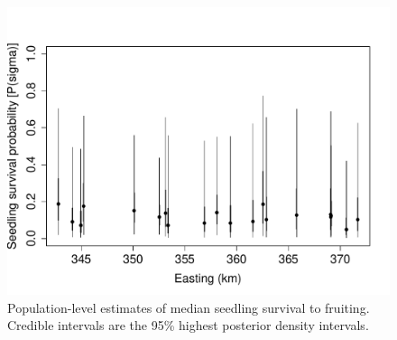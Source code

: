 \documentclass[12pt, oneside]{article}   	%
\begin{document}
 \begin{figure}[!h]
   \centering
       \includegraphics[page=1,width=\textwidth]{../../figures/spatial-sigma.pdf}  
    \caption{ Population-level estimates of median seedling survival to fruiting. Credible intervals are the 95\% highest posterior density intervals. }
 \label{fig:viability-estimates-population}
\end{figure}
\end{document}
